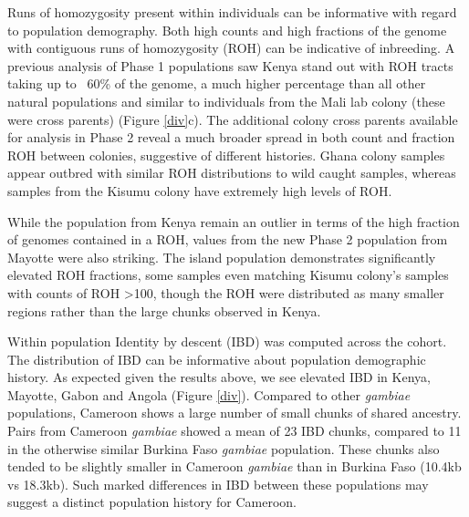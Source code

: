 \documentclass[a4paper,11pt,abstracton,hidelinks]{scrartcl}
\begin{document}
Runs of homozygosity present within individuals can be informative with regard to population demography.
%
Both high counts and high fractions of the genome with contiguous runs of homozygosity (ROH) can be indicative of inbreeding.
%
A previous analysis of Phase 1 populations \cite{Ag1000gConsortium2017} saw Kenya stand out with ROH tracts taking up to ~60\% of the genome, a much higher percentage than all other natural populations and similar to individuals from the  Mali lab colony (these were cross parents) (Figure \ref{div}c). 
%
The additional colony cross parents available for analysis in Phase 2 reveal a much broader spread in both count and fraction ROH between colonies, suggestive of different histories.
%
Ghana colony samples appear outbred with similar ROH distributions to wild caught samples, whereas samples from the Kisumu colony have extremely high levels of ROH.    

While the population from Kenya remain an outlier in terms of the high fraction of genomes contained in a ROH, values from the new Phase 2 population from Mayotte were also striking.
%
The island population demonstrates significantly elevated ROH fractions, some samples even matching Kisumu colony's samples with counts of ROH >100, though the ROH were distributed as many smaller regions rather than the large chunks observed in Kenya.

Within population Identity by descent (IBD) was computed across the cohort. 
%
The distribution of IBD can be informative about population demographic history. 
%
As expected given the results above, we see elevated IBD in Kenya, Mayotte, Gabon and Angola (Figure \ref{div}).
%
Compared to other \emph{gambiae} populations, Cameroon shows a large number of small chunks of shared ancestry.
%
Pairs from Cameroon \emph{gambiae} showed a mean of 23 IBD chunks, compared to 11 in the otherwise similar Burkina Faso \emph{gambiae} population.
%
These chunks also tended to be slightly smaller in Cameroon \emph{gambiae} than in Burkina Faso (10.4kb vs 18.3kb). 
%
Such marked differences in IBD between these populations may suggest a distinct population history for Cameroon.
\end{document}
